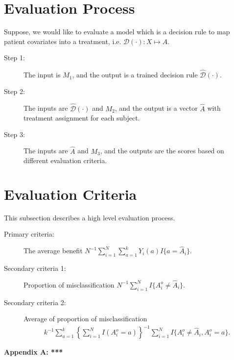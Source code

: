 \documentclass[12pt]{article}
\renewcommand{\theequation} {\arabic{section}.\arabic{equation}}
\def\hat{\widehat}
\def\cal{\mathcal}
\def\calD{{\cal D}} %
\begin{document}
\section{Evaluation Process} \label{sec.EvalProc}

Suppose, we would like to evaluate a model which is a decision rule to map patient covariates into a treatment, i.e. $\calD(\cdot): X \mapsto A$.
\begin{description}
\item[Step 1:] The input is $M_1$, and the output is a trained decision rule $\hat{\calD}(\cdot)$.
\item[Step 2:] The inputs are $\hat{\calD}(\cdot)$ and $M_2$, and the output is a vector $\hat{A}$ with treatment assignment for each subject.
\item[Step 3:] The inputs are $\hat{A}$ and $M_3$, and the outputs are the scores based on different evaluation criteria.
\end{description}

\section{Evaluation Criteria}
This subsection describes a high level evaluation process.



\begin{description}
\item[Primary criteria:]  The average benefit $N^{-1}\sum_{i=1}^{N} \sum_{a=1}^k Y_{i}(a) I\{a=\hat{A}_i\}$.
\item[Secondary criteria 1:] Proportion of misclassification $N^{-1}\sum_{i=1}^{N} I\{A^o_i \neq \hat{A}_i\}$.
\item[Secondary criteria 2:] Average of proportion of misclassification
 \begin{eqnarray*}
k^{-1} \sum_{a=1}^k \left\{\sum_{i=1}^{N} I(A^o_i=a)\right\}^{-1} \sum_{i=1}^{N} I\{A^o_i \neq  \hat{A}_i, A^o_i=a\}.
\end{eqnarray*}
\end{description}








\setcounter{equation}{0}
\renewcommand{\theequation} {A.\arabic{equation}}
\begin{center}
\bf \Large Appendix A: ***
\end{center}
\end{document}
